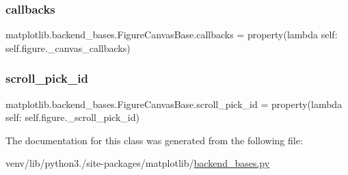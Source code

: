 \subsubsection{\texorpdfstring{callbacks}{callbacks}}
{\footnotesize\ttfamily matplotlib.\+backend\+\_\+bases.\+Figure\+Canvas\+Base.\+callbacks = property(lambda self\+: self.\+figure.\+\_\+canvas\+\_\+callbacks)\hspace{0.3cm}{\ttfamily [static]}}

\mbox{\label{classmatplotlib_1_1backend__bases_1_1FigureCanvasBase_a638e0276c2e4c0357ea446fd61fd8906}} 
\subsubsection{\texorpdfstring{scroll\+\_\+pick\+\_\+id}{scroll\_pick\_id}}
{\footnotesize\ttfamily matplotlib.\+backend\+\_\+bases.\+Figure\+Canvas\+Base.\+scroll\+\_\+pick\+\_\+id = property(lambda self\+: self.\+figure.\+\_\+scroll\+\_\+pick\+\_\+id)\hspace{0.3cm}{\ttfamily [static]}}



The documentation for this class was generated from the following file\+:\begin{DoxyCompactItemize}
\item 
venv/lib/python3./site-\/packages/matplotlib/\hyperlink{backend__bases_8py}{backend\+\_\+bases.\+py}\end{DoxyCompactItemize}
